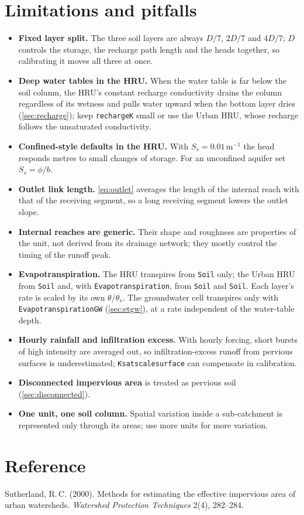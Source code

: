\documentclass[11pt,a4paper]{article}
\newcommand{\code}[1]{\texttt{\small #1}}
\renewcommand{\_}{\oldus\allowbreak}   %
\begin{document}
\section{Limitations and pitfalls}
\begin{itemize}[leftmargin=1.4em]
\item \textbf{Fixed layer split.} The three soil layers are always $D/7$, $2D/7$ and $4D/7$; $D$
  controls the storage, the recharge path length and the heads together, so calibrating it moves all
  three at once.
\item \textbf{Deep water tables in the HRU.} When the water table is far below the soil column, the
  HRU's constant recharge conductivity drains the column regardless of its wetness and pulls water
  upward when the bottom layer dries (\cref{sec:recharge}); keep \code{recharge\_K} small or use the
  Urban HRU, whose recharge follows the unsaturated conductivity.
\item \textbf{Confined-style defaults in the HRU.} With $S_s=0.01$\,m$^{-1}$ the head responds
  metres to small changes of storage. For an unconfined aquifer set $S_s=\phi/b$.
\item \textbf{Outlet link length.} \eqref{eq:outlet} averages the length of the internal reach with
  that of the receiving segment, so a long receiving segment lowers the outlet slope.
\item \textbf{Internal reaches are generic.} Their shape and roughness are properties of the unit,
  not derived from its drainage network; they mostly control the timing of the runoff peak.
\item \textbf{Evapotranspiration.} The HRU transpires from \code{Soil\_1} only; the Urban HRU from
  \code{Soil\_1} and, with \code{Evapotranspiration\_2}, from \code{Soil\_2} and \code{Soil\_3}. Each
  layer's rate is scaled by its own $\theta/\theta_s$. The groundwater cell transpires only with
  \code{Evapotranspiration\_GW} (\cref{sec:etgw}), at a rate independent of the water-table depth.
\item \textbf{Hourly rainfall and infiltration excess.} With hourly forcing, short bursts of high
  intensity are averaged out, so infiltration-excess runoff from pervious surfaces is underestimated;
  \code{K\_sat\_scale\_surface} can compensate in calibration.
\item \textbf{Disconnected impervious area} is treated as pervious soil (\cref{sec:disconnected}).
\item \textbf{One unit, one soil column.} Spatial variation inside a sub-catchment is represented
  only through its areas; use more units for more variation.
\end{itemize}

\section*{Reference}
\noindent Sutherland, R.\,C. (2000). Methods for estimating the effective impervious area of urban
watersheds. \emph{Watershed Protection Techniques} 2(4), 282--284.
\end{document}
